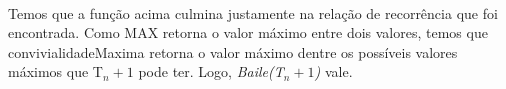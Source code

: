 \documentclass[a4paper]{article}
\begin{document}
\paragraph{}Temos que a função acima culmina justamente na relação de recorrência que foi encontrada. Como MAX retorna o valor máximo entre dois valores, temos que convivialidadeMaxima retorna o valor máximo dentre os possíveis valores máximos que T$_n+1$ pode ter. Logo, \emph{Baile(T$_n+1$)} vale.\\
\end{document}
